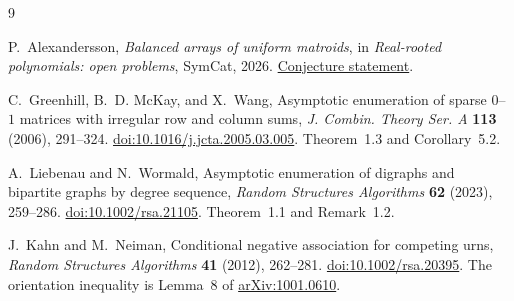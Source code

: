 \documentclass[11pt]{article}
\begin{document}
\begin{thebibliography}{9}
\raggedright
{}
P.~Alexandersson, \emph{Balanced arrays of uniform matroids},
in \emph{Real-rooted polynomials: open problems}, SymCat, 2026.
\href{https://www.symmetricfunctions.com/realRootedOpenProblems.htm\#conjBalancedArrays}
{Conjecture statement}.

C.~Greenhill, B.~D. McKay, and X.~Wang,
Asymptotic enumeration of sparse $0$--$1$ matrices with irregular
row and column sums,
\emph{J. Combin. Theory Ser. A} \textbf{113} (2006), 291--324.
\href{https://doi.org/10.1016/j.jcta.2005.03.005}{doi:10.1016/j.jcta.2005.03.005}.
Theorem~1.3 and Corollary~5.2.

A.~Liebenau and N.~Wormald,
Asymptotic enumeration of digraphs and bipartite graphs by degree sequence,
\emph{Random Structures Algorithms} \textbf{62} (2023), 259--286.
\href{https://doi.org/10.1002/rsa.21105}{doi:10.1002/rsa.21105}.
Theorem~1.1 and Remark~1.2.

J.~Kahn and M.~Neiman,
Conditional negative association for competing urns,
\emph{Random Structures Algorithms} \textbf{41} (2012), 262--281.
\href{https://doi.org/10.1002/rsa.20395}{doi:10.1002/rsa.20395}.
The orientation inequality is Lemma~8 of
\href{https://arxiv.org/abs/1001.0610}{arXiv:1001.0610}.
\end{thebibliography}
\end{document}
